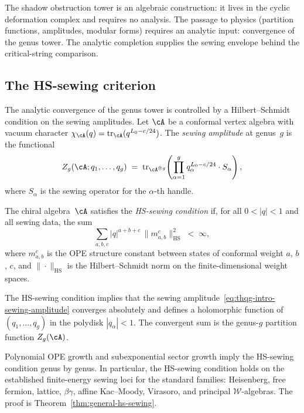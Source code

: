 The shadow obstruction tower is an algebraic construction: it lives in
the cyclic deformation complex and requires no analysis. The passage
to physics (partition functions, amplitudes, modular forms) requires
an analytic input: convergence of the genus tower. The analytic
completion supplies the sewing envelope behind the critical-string
comparison.

\subsection{The HS-sewing criterion}
\label{subsec:thqg-intro-hs-sewing}

The analytic convergence of the genus tower is controlled by a
Hilbert--Schmidt condition on the sewing amplitudes. Let
$\cA$ be a conformal vertex algebra with vacuum character
$\chi_\cA(q) = \operatorname{tr}_\cA(q^{L_0 - c/24})$. The
\emph{sewing amplitude} at genus~$g$ is the functional
\begin{equation}\label{eq:thqg-intro-sewing-amplitude}
Z_g(\cA; q_1, \ldots, q_g)
\;=\;
\operatorname{tr}_{\cA^{\otimes g}}\!\left(
 \prod_{\alpha=1}^g q_\alpha^{L_0 - c/24}
 \cdot S_\alpha
\right),
\end{equation}
where $S_\alpha$ is the sewing operator for the $\alpha$-th handle.

\begin{definition}
\label{def:thqg-intro-hs-sewing}
The chiral algebra~$\cA$ satisfies the \emph{HS-sewing condition} if,
for all $0 < |q| < 1$ and all sewing data, the sum
\begin{equation}\label{eq:thqg-intro-hs-condition}
\sum_{a,b,c} |q|^{a+b+c}\, \|m^c_{a,b}\|_{\mathrm{HS}}^2
\;<\; \infty,
\end{equation}
where $m^c_{a,b}$ is the OPE structure constant between states of
conformal weight $a$, $b$, $c$, and $\|\cdot\|_{\mathrm{HS}}$ is
the Hilbert--Schmidt norm on the finite-dimensional weight spaces.
\end{definition}

The HS-sewing condition implies that the sewing
amplitude~\eqref{eq:thqg-intro-sewing-amplitude} converges absolutely
and defines a holomorphic function of $(q_1, \ldots, q_g)$ in the
polydisk $|q_\alpha| < 1$. The convergent sum is the genus-$g$
partition function $Z_g(\cA)$.

\begin{theorem}
\label{thm:thqg-intro-hs-general}
Polynomial OPE growth and subexponential sector growth imply the
HS-sewing condition genus by genus. In particular, the HS-sewing
condition holds on the established finite-energy sewing loci for the
standard families: Heisenberg, free fermion, lattice, $\beta\gamma$,
affine Kac--Moody, Virasoro, and principal $\mathcal{W}$-algebras.
The proof is
Theorem~\textup{\ref{thm:general-hs-sewing}}.
\end{theorem}


